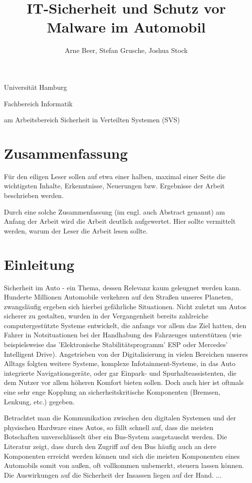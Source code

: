 \documentclass[
    fontsize=12pt,
    headings=small,
    parskip=half,           %
    bibliography=totoc,9
    numbers=noenddot,       %
    open=any,               %
    ]{scrreprt}
\title{IT-Sicherheit und Schutz vor Malware im Automobil}
\author{Arne Beer, Stefan Grusche, Joshua Stock}
\begin{document}
\begin{titlepage}
\begin{center}\Large
    Universität Hamburg \par
    Fachbereich Informatik
    \vfill
    \makeatletter
    {\Large\textsf{\textbf{\@title}}\par}
    \makeatother
    \bigskip
    am Arbeitsbereich Sicherheit in Verteilten Systemen (SVS) \par
    \bigskip
    \makeatletter
    {\@author} \par
    \makeatother
    \bigskip
    \makeatletter
    {\@date}
    \makeatother
    \vfill
    \vfill
\end{center}
\end{titlepage}




\chapter*{Zusammenfassung}
Für den eiligen Leser sollen auf etwa einer halben, maximal einer Seite die wichtigsten Inhalte, Erkenntnisse, Neuerungen bzw. Ergebnisse der Arbeit beschrieben werden.

Durch eine solche Zusammenfassung (im engl. auch Abstract genannt) am Anfang der Arbeit wird die Arbeit deutlich aufgewertet. Hier sollte vermittelt werden, warum der Leser die Arbeit lesen sollte.

\tableofcontents

\chapter{Einleitung}
Sicherheit im Auto - ein Thema, dessen Relevanz kaum geleugnet werden kann. Hunderte Millionen Automobile verkehren auf den Straßen unseres Planeten, zwangsläufig ergeben sich hierbei gefährliche Situationen. Nicht zuletzt um Autos sicherer zu gestalten, wurden in der Vergangenheit bereits zahlreiche computergestützte Systeme entwickelt, die anfangs vor allem das Ziel hatten, den Fahrer in Notsituationen bei der Handhabung des Fahrzeuges unterstützen (wie beispielsweise das 'Elektronische Stabilitätsprogramm' ESP oder Mercedes' Intelligent Drive). Angetrieben von der Digitalisierung in vielen Bereichen unseres Alltags folgten weitere Systeme, komplexe Infotainment-Systeme, in das Auto integrierte Navigationsgeräte, oder gar Einpark- und Spurhalteassistenten, die dem Nutzer vor allem höheren Komfort bieten sollen. Doch auch hier ist oftmals eine sehr enge Kopplung an sicherheitskritische Komponenten (Bremsen, Lenkung, etc.) gegeben.\par
Betrachtet man die Kommunikation zwischen den digitalen Systemen und der physischen Hardware eines Autos, so fällt schnell auf, dass die meisten Botschaften unverschlüsselt über ein Bus-System ausgetauscht werden. Die Literatur zeigt, dass durch den Zugriff auf den Bus häufig auch an dere Komponenten erreicht werden können und sich die meisten Komponenten eines Automobils somit von außen, oft vollkommen unbemerkt, steuern lassen können. Die Auswirkungen auf die Sicherheit der Insassen liegen auf der Hand. ... %
\end{document}
